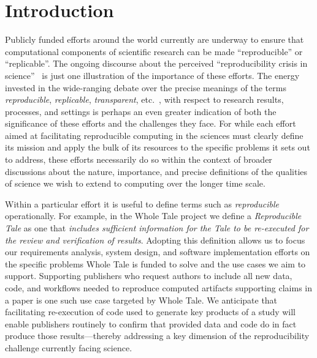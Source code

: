 
\section{Introduction}

Publicly funded efforts around the world currently are underway to 
	ensure that computational components of scientific research
	can be made ``reproducible'' or ``replicable''.
The ongoing discourse about the perceived ``reproducibility crisis in science''~\cite{donoho_reproducible_2009,baker_2016,fanelli_opinion:_2018} 
	is just one illustration of the importance of these efforts.
The energy invested in the wide-ranging debate over the precise meanings of the 
	terms \emph{reproducible}, \emph{replicable},
        \emph{transparent}, etc.\
        \cite{drummond2009replicability,carolegoble2016what,freire2016reproducibilitya,goodman2016what,ioannidis2017reproducibility,herouxtoward,plesser2018reproducibility,barba2018terminologies,committeeonreproducibilityandreplicabilityinscience2019reproducibility}, with 
	respect to research results, processes, and settings is perhaps an even greater indication of 
	both the significance of these efforts and the challenges they face.
For while each effort aimed at facilitating reproducible computing in the
	sciences must clearly define its mission and apply the bulk of its resources
	to the specific problems it sets out to address, these efforts necessarily do
	so within the context of broader discussions about the nature, importance,
	and precise definitions of the qualities of science we wish to extend to computing
	over the longer time scale.

Within a particular effort it is useful to define terms such as \emph{reproducible} operationally.
For example, in the Whole Tale project \cite{WT2019,brinckman2019computing} we define a \emph{Reproducible Tale} as one 
	that \emph{includes sufficient information for the Tale to be re-executed for the review 
	and verification of results}.
Adopting this definition allows us to focus our requirements analysis, system design,
	and software implementation efforts on the specific problems Whole Tale is funded to solve
	and the use cases we aim to support.
Supporting publishers who request authors to include all new data, 
	code, and workflows needed to reproduce computed artifacts supporting
	claims in a paper is one such use case targeted by Whole Tale.
We anticipate that facilitating re-execution of code used to generate
	key products of a study will enable publishers routinely to confirm that
	provided data and code do in fact produce those results---thereby addressing
	a key dimension of the reproducibility challenge currently facing science.

